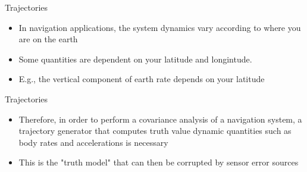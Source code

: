 \begin{frame}
Trajectories
 \begin{itemize}
 \item In navigation applications, the system dynamics vary according to where you are on the earth
 \item Some quantities are dependent on your latitude and longintude.
 \item E.g., the vertical component of earth rate depends on your latitude
\end{itemize}
\end{frame}

\begin{frame}
Trajectories
\begin{itemize}
 \item Therefore, in order to perform a covariance analysis of a navigation system, a trajectory generator that computes truth value dynamic quantities such as body rates and accelerations is necessary
 \item This is the "truth model" that can then be corrupted by sensor error sources
\end{itemize} 
\end{frame}
